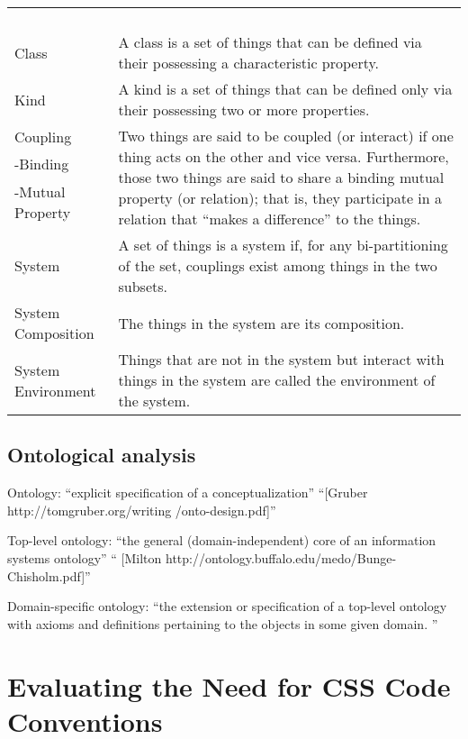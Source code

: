 \documentclass[parskip=full]{uvamscse}
\begin{document}
\begin{center}
\begin{longtable}{ | p{11em} | p{30em} | }
 &  \\ 
 &  \\
 &  \\
 &  \\ 
 \hline
 Class&  A class is a set of things that can be defined via their possessing a characteristic property. \\ 
 \hline
 Kind&  A kind is a set of things that can be defined only via their possessing two or more properties. \\ 
\hline
Coupling & \multirow{4}{30em}{Two things are said to be coupled (or interact) if one thing acts on the other and vice versa. Furthermore, those two things are said to share a binding mutual property (or relation); that is, they participate in a relation that ``makes a difference'' to the things.} \\
-Binding &  \\
-Mutual Property &  \\
 &  \\
 \hline 
 System& A set of things is a system if, for any bi-partitioning of the set, couplings exist among things in the two subsets. \\
 \hline
 System Composition& The things in the system are its composition. \\
 \hline
 System Environment&  Things that are not in the system but interact with things in the system are called the environment of the system. \\
 \hline
\end{longtable}
\end{center}

\section{Ontological analysis}

Ontology: ``explicit specification of a conceptualization'' ``[Gruber http://tomgruber.org/writing
/onto-design.pdf]''

Top-level ontology: ``the general (domain-independent) core of an information systems ontology''
``
[Milton http://ontology.buffalo.edu/medo/Bunge-Chisholm.pdf]''

Domain-specific ontology: ``the extension or specification of a top-level ontology with axioms and
definitions pertaining to the objects in some given domain. ''

\chapter{Evaluating the Need for CSS Code Conventions}
\end{document}
